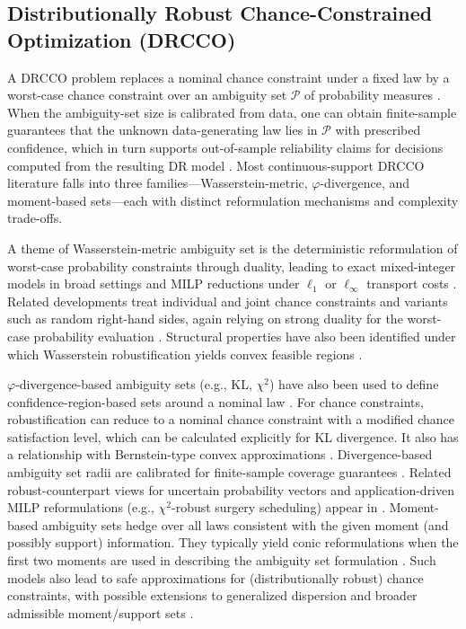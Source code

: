 \documentclass[opre,sglanonrev]{informs4}
\newcommand{\mP}{\mathcal{P}}
\begin{document}
\subsection{Distributionally Robust Chance-Constrained Optimization (DRCCO)}

A DRCCO problem replaces a nominal chance constraint under a fixed law by a worst-case chance constraint over an ambiguity set $\mP$ of probability measures \cite{shapiro_dentcheva_ruszczynski_2014}. When the ambiguity-set size is calibrated from data, one can obtain finite-sample guarantees that the unknown data-generating law lies in $\mP$ with prescribed confidence, which in turn supports out-of-sample reliability claims for decisions computed from the resulting DR model \cite{lam_2019}. Most continuous-support DRCCO literature falls into three families—Wasserstein-metric, $\varphi$-divergence, and moment-based sets—each with distinct reformulation mechanisms and complexity trade-offs.

 A theme of Wasserstein-metric ambiguity set is the deterministic reformulation of worst-case probability constraints through duality, leading to exact mixed-integer models in broad settings and MILP reductions under $\ell_1$ or $\ell_\infty$ transport costs \cite{xie_2019,chen_kuhn_wiesemann_2022}. Related developments treat individual and joint chance constraints and variants such as random right-hand sides, again relying on strong duality for the worst-case probability evaluation \cite{ji_lejeune_2020,ho_nguyen_kilic_2021}. Structural properties have also been identified under which Wasserstein robustification yields convex feasible regions \cite{shen_jiang_2021}.

 
$ \varphi$-divergence-based ambiguity sets (e.g., KL, $\chi^2$) have also been used to define confidence-region-based sets around a nominal law \cite{ben-tal_ghaoui_nemirovski_2009,duchi_namkoong_2019}. 
For chance constraints, robustification can reduce to a nominal chance constraint with a modified chance satisfaction level, which can be calculated explicitly for KL divergence. It also has a relationship with Bernstein-type convex approximations \cite{hu_hong_2013,nemirovski_shapiro_2006}. 
Divergence-based ambiguity set radii are calibrated for finite-sample coverage guarantees \cite{jiang_guan_2016,lam_2019,duchi_namkoong_2019}. Related robust-counterpart views for uncertain probability vectors and application-driven MILP reformulations (e.g., $\chi^2$-robust surgery scheduling) appear in \cite{ben-tal_den-hertog_dewaegenaere_2013,deng_shen_denton_2019}.
Moment-based ambiguity sets hedge over all laws consistent with the given moment (and possibly support) information. They typically yield conic reformulations when the first two moments are used in describing the ambiguity set formulation \cite{shapiro_dentcheva_ruszczynski_2014,delage_ye_2010}.  Such models also lead to safe approximations for (distributionally robust) chance constraints, with possible extensions to generalized dispersion and broader admissible moment/support sets \cite{hanasusanto_kuhn_wiesemann_zymler_2015,ding_etal_2020}. 
\end{document}
